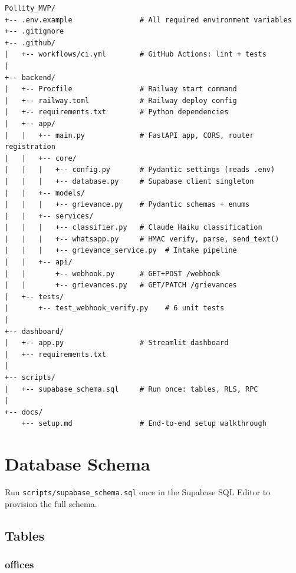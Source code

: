 \documentclass[11pt, a4paper]{article}
\begin{document}
\begin{tcolorbox}[colback=codegray, colframe=codeframe, sharp corners, fontupper=\small\ttfamily]
\begin{verbatim}
Pollity_MVP/
+-- .env.example                # All required environment variables
+-- .gitignore
+-- .github/
|   +-- workflows/ci.yml        # GitHub Actions: lint + tests
|
+-- backend/
|   +-- Procfile                # Railway start command
|   +-- railway.toml            # Railway deploy config
|   +-- requirements.txt        # Python dependencies
|   +-- app/
|   |   +-- main.py             # FastAPI app, CORS, router registration
|   |   +-- core/
|   |   |   +-- config.py       # Pydantic settings (reads .env)
|   |   |   +-- database.py     # Supabase client singleton
|   |   +-- models/
|   |   |   +-- grievance.py    # Pydantic schemas + enums
|   |   +-- services/
|   |   |   +-- classifier.py   # Claude Haiku classification
|   |   |   +-- whatsapp.py     # HMAC verify, parse, send_text()
|   |   |   +-- grievance_service.py  # Intake pipeline
|   |   +-- api/
|   |       +-- webhook.py      # GET+POST /webhook
|   |       +-- grievances.py   # GET/PATCH /grievances
|   +-- tests/
|       +-- test_webhook_verify.py    # 6 unit tests
|
+-- dashboard/
|   +-- app.py                  # Streamlit dashboard
|   +-- requirements.txt
|
+-- scripts/
|   +-- supabase_schema.sql     # Run once: tables, RLS, RPC
|
+-- docs/
    +-- setup.md                # End-to-end setup walkthrough
\end{verbatim}
\end{tcolorbox}

\newpage

\section{Database Schema}

Run \texttt{scripts/supabase\_schema.sql} once in the Supabase SQL Editor to provision the full schema.

\subsection{Tables}

\subsubsection{offices}
\end{document}
